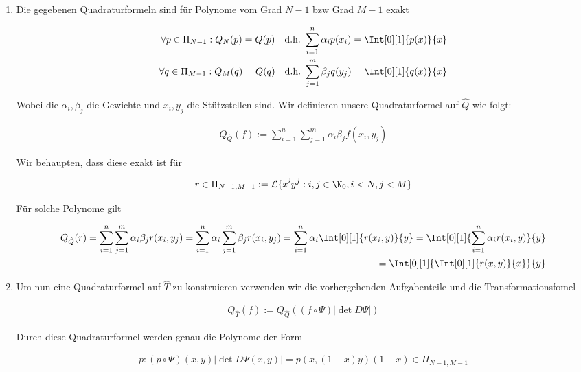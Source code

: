 \begin{solution}
\begin{enumerate}[label = \textbf{\alph*)}]
  \item Die gegebenen Quadraturformeln sind für Polynome vom Grad $N-1$ bzw Grad $M-1$ exakt

  \begin{align*}
    \forall p \in \Pi_{N-1}:
    Q_N(p) = Q(p)
    \quad \text{d.h.}~
    \sum_{i = 1}^n \alpha_i p(x_i)
    =
    \Int[0][1]{p(x)}{x} \\
    \forall q \in \Pi_{M-1}:
    Q_M(q) = Q(q)
    \quad \text{d.h.}~
    \sum_{j = 1}^m \beta_j q(y_j)
    =
    \Int[0][1]{q(x)}{x}
  \end{align*}

  Wobei die $\alpha_i, \beta_j$ die Gewichte und $x_i, y_j$ die Stützstellen sind.
  Wir definieren unsere Quadraturformel auf $\hat{Q}$ wie folgt:

  \begin{align*}
    Q_{\hat{Q}}(f)
    :=
    \sum_{i=1}^n \sum_{j=1}^m \alpha_i \beta_j f(x_i, y_j)
  \end{align*}

  Wir behaupten, dass diese exakt ist für

  \begin{align*}
    r \in \Pi_{N-1,M-1} := \mathcal{L}\{x^i y^j: i,j \in \N_0, i < N, j < M\}
  \end{align*}

  Für solche Polynome gilt

  \begin{align*}
  Q_{\hat{Q}}(r)
  =
  \sum_{i=1}^n \sum_{j=1}^m \alpha_i \beta_j r(x_i, y_j)
  =
  \sum_{i=1}^n \alpha_i \sum_{j=1}^m \beta_j r(x_i, y_j)
  =
  \sum_{i=1}^n \alpha_i \Int[0][1]{r(x_i,y)}{y}
  =
  \Int[0][1]{\sum_{i=1}^n \alpha_i r(x_i,y)}{y} \\
  =
  \Int[0][1]{
      \Int[0][1]{r(x,y)}{x}
            }{y}
  \end{align*}

  \item Um nun eine Quadraturformel auf $\hat{T}$ zu konstruieren verwenden wir die vorhergehenden Aufgabenteile
  und die Transformationsfomel

  \begin{align*}
    Q_{\hat{T}}(f)
    :=
    Q_{\hat{Q}}((f\circ \Psi) |\det D\Psi|)
  \end{align*}

  Durch diese Quadraturformel werden genau die Polynome der Form

  \begin{align*}
    p: (p \circ \Psi)(x,y) |\det D\Psi(x,y)| = p(x,(1-x)y)(1-x)\in \Pi_{N-1,M-1}
  \end{align*}


\end{enumerate}
\end{solution}

